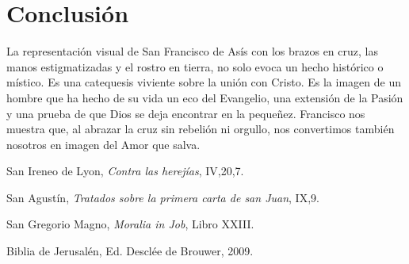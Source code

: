 \documentclass[12pt]{article}
\begin{document}
	\section*{Conclusión}
	
	La representación visual de San Francisco de Asís con los brazos en cruz, las manos estigmatizadas y el rostro en tierra, no solo evoca un hecho histórico o místico. Es una catequesis viviente sobre la unión con Cristo. Es la imagen de un hombre que ha hecho de su vida un eco del Evangelio, una extensión de la Pasión y una prueba de que Dios se deja encontrar en la pequeñez. Francisco nos muestra que, al abrazar la cruz sin rebelión ni orgullo, nos convertimos también nosotros en imagen del Amor que salva.
	
	\begin{thebibliography}{9}
		
		San Ireneo de Lyon, \textit{Contra las herejías}, IV,20,7.
		
		San Agustín, \textit{Tratados sobre la primera carta de san Juan}, IX,9.
		
		San Gregorio Magno, \textit{Moralia in Job}, Libro XXIII.
		
		Biblia de Jerusalén, Ed. Desclée de Brouwer, 2009.
		
	\end{thebibliography}
	
\end{document}
